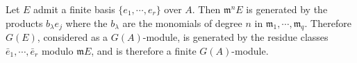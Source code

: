 Let $E$ admit a finite basis $\{e_1, \cdots, e_r\}$ over $A$. Then $\mathfrak{m}^n E$ is generated by the products $b_\lambda e_j$ where the $b_\lambda$ are the monomials of degree $n$ in $\mathfrak{m}_1, \cdots, \mathfrak{m}_q$. Therefore $G(E)$, considered as a $G(A)$-module, is generated by the residue classes $\bar{e}_1, \cdots, \bar{e}_r$ modulo $\mathfrak{m}E$, and is therefore a finite $G(A)$-module.